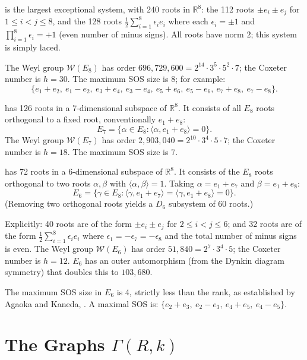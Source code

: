 \documentclass[11pt]{article}
\newcommand{\W}{\mathcal{W}}
\begin{document}
 is the largest exceptional system, with 240 roots in $\mathbb{R}^8$: the 112 roots $\pm e_i \pm e_j$ for $1 \leq i < j \leq 8$, and the 128 roots $\frac{1}{2}\sum_{i=1}^{8} \epsilon_i e_i$ where each $\epsilon_i = \pm 1$ and $\prod_{i=1}^{8} \epsilon_i = +1$ (even number of minus signs). All roots have norm $2$; this system is simply laced.

The Weyl group $\W(E_8)$ has order $696{,}729{,}600 = 2^{14} \cdot 3^5 \cdot 5^2 \cdot 7$; the Coxeter number is $h = 30$. The maximum SOS size is 8; for example:
\[
\{e_1 + e_2,\ e_1 - e_2,\ e_3 + e_4,\ e_3 - e_4,\ e_5 + e_6,\ e_5 - e_6,\ e_7 + e_8,\ e_7 - e_8\}.
\]

 has 126 roots in a 7-dimensional subspace of $\mathbb{R}^8$. It consists of all $E_8$ roots orthogonal to a fixed root, conventionally $e_1 + e_8$:
\[
E_7 = \{\alpha \in E_8 : \langle \alpha, e_1 + e_8 \rangle = 0\}.
\]
The Weyl group $\W(E_7)$ has order $2{,}903{,}040 = 2^{10} \cdot 3^4 \cdot 5 \cdot 7$; the Coxeter number is $h = 18$. The maximum SOS size is 7.


 has 72 roots in a 6-dimensional subspace of $\mathbb{R}^8$. It consists of the $E_8$ roots orthogonal to two roots $\alpha, \beta$ with $\langle \alpha, \beta \rangle = 1$. Taking $\alpha = e_1 + e_7$ and $\beta = e_1 + e_8$:
\[
E_6 = \{\gamma \in E_8 : \langle \gamma, e_1 + e_7 \rangle = \langle \gamma, e_1 + e_8 \rangle = 0\}.
\]
(Removing two orthogonal roots yields a $D_6$ subsystem of 60 roots.)

Explicitly: 40 roots are of the form $\pm e_i \pm e_j$ for $2 \leq i < j \leq 6$; and 32 roots are of the form $\frac{1}{2}\sum_{i=1}^{8} \epsilon_i e_i$ where $\epsilon_1 = -\epsilon_7 = -\epsilon_8$ and the total number of minus signs is even. The Weyl group $\W(E_6)$ has order $51{,}840 = 2^7 \cdot 3^4 \cdot 5$; the Coxeter number is $h = 12$. $E_6$ has an outer automorphism (from the Dynkin diagram symmetry) that doubles this to $103{,}680$.

The maximum SOS size in $E_6$ is 4, strictly less than the rank, as established by Agaoka and Kaneda, \cite{Agaoka}. A maximal SOS is:
$\{e_2 + e_3,\ e_2 - e_3,\ e_4 + e_5,\ e_4 - e_5\}$.


\section{The Graphs $\Gamma(R, k)$}\label{sec:construction}
\end{document}
